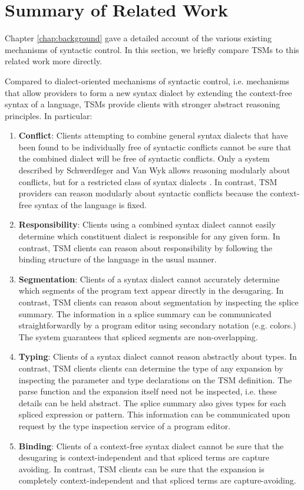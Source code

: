 \section{Summary of Related Work}
\vspace{-4px}
Chapter \ref{chap:background} gave a detailed account of the various existing mechanisms of syntactic control. In this section, we briefly compare TSMs to this related work more directly.

Compared to dialect-oriented mechanisms of syntactic control, i.e. mechanisms that allow  providers to form a new syntax dialect by extending the context-free syntax of a language, TSMs provide clients with stronger abstract reasoning principles. In particular:
\begin{enumerate}
\item \textbf{Conflict}: Clients attempting to combine general syntax dialects that have been found to be individually free of syntactic conflicts cannot  be sure that the combined dialect will be free of syntactic conflicts. Only a system described by Schwerdfeger and Van Wyk allows reasoning modularly about conflicts, but for a restricted class of syntax dialects \cite{conf/pldi/SchwerdfegerW09}. In contrast, TSM providers can reason modularly about syntactic conflicts because the context-free syntax of the language is fixed.
\item \textbf{Responsibility}: Clients using a combined syntax dialect cannot easily determine which constituent dialect is responsible for any given form. In contrast, TSM clients can reason about responsibility by following the binding structure of the language in the usual manner.
\item \textbf{Segmentation}: Clients of a syntax dialect cannot accurately determine which segments of the program text appear directly in the desugaring. In contrast, TSM clients can reason about segmentation by inspecting the splice summary. The information in a splice summary can be communicated straightforwardly by a program editor using secondary notation (e.g. colors.) The system guarantees that spliced segments are non-overlapping.
\item \textbf{Typing}: Clients of a syntax dialect cannot reason abstractly about types. In contrast, TSM clients clients can determine the type of any expansion by inspecting the parameter and type declarations on the TSM definition. The parse function and the expansion itself need not be inspected, i.e. these details can be held abstract. The splice summary also gives types for each spliced expression or pattern. This information can be communicated upon request by the type inspection service of a program editor.
\item \textbf{Binding}: Clients of a context-free syntax dialect cannot be sure that the desugaring is context-independent and that spliced terms are capture avoiding. In contrast, TSM clients can be sure that the expansion is completely context-independent and that spliced terms are capture-avoiding.
\end{enumerate}

